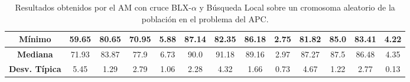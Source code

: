 \documentclass[11pt,a4paper]{article}
\begin{document}
\begin{table}[H]
{\begin{tabular}{c|c|c|c|c|c|c|c|c|c|c|c|c|}
\multicolumn{1}{|c|}{\textbf{Mínimo}}       & 59.65             & 80.65                   & 70.95         & 5.88       & 87.14             & 82.35          & 86.18         & 2.75       & 81.82             & 85.0           & 83.41         & 4.22       \\ \hline
\multicolumn{1}{|c|}{\textbf{Mediana}}      & 71.93             & 83.87                   & 77.9          & 6.73       & 90.0              & 91.18          & 89.16         & 2.97       & 87.27             & 87.5           & 86.48         & 4.35       \\ \hline
\multicolumn{1}{|c|}{\textbf{Desv. Típica}} & 5.45              & 1.29                    & 2.79          & 1.06       & 2.28              & 4.32           & 1.66          & 0.73       & 4.67              & 1.22           & 2.77          & 0.13       \\ \hline
\end{tabular}
}%
\caption{Resultados obtenidos por el AM con cruce BLX-$\alpha$ y Búsqueda Local sobre un cromosoma aleatorio  de la población
en el problema del APC.}
\end{table}
\end{document}
